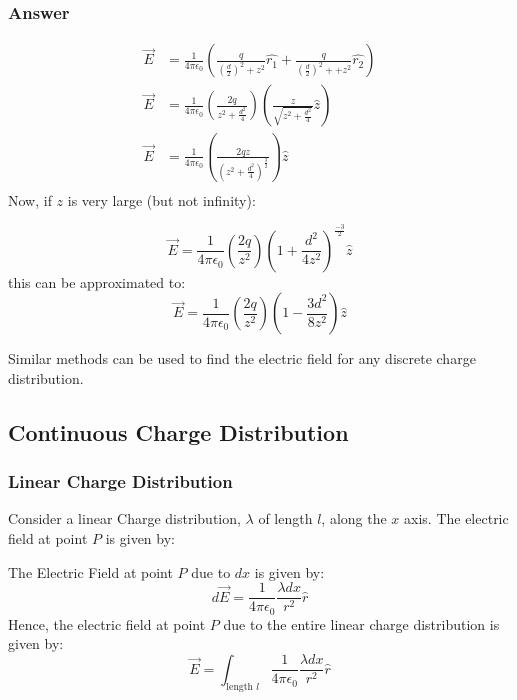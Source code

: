\documentclass{article}
\begin{document}
\subsubsection*{Answer}
\begin{align*}
	\vec{E} & = \frac{1}{4\pi\epsilon_0} \left( \frac{q}{\left(\frac{d}{2}\right)^2 + z^2} \hat{r_1} + \frac{q}{\left(\frac{d}{2}\right)^2 + + z^2} \hat{r_2} \right) \\
	\vec{E} & = \frac{1}{4\pi\epsilon_0} \left( \frac{2q}{z^2 + \frac{d^2}{4}}\right) \left(\frac{z}{\sqrt{z^2 + \frac{d^2}{4}}}\hat{z}\right)                        \\
	\vec{E} & = \frac{1}{4\pi\epsilon_0} \left( \frac{2qz}{\left(z^2 + \frac{d^2}{4}\right)^{\frac{3}{2}}}\right) \hat{z}                                             \\
\end{align*}
Now, if $z$ is very large (but not infinity):

\[\vec{E} = \frac{1}{4\pi\epsilon_0} \left( \frac{2q}{z^2}\right)\left(1 + \frac{d^2}{4z^2}\right)^{\frac{-3}{2}} \hat{z}\]
this can be approximated to:
\[\vec{E} = \frac{1}{4\pi\epsilon_0} \left( \frac{2q}{z^2}\right)\left(1 - \frac{3d^2}{8z^2}\right) \hat{z}\]

Similar methods can be used to find the electric field for any discrete charge distribution.

\subsection{Continuous Charge Distribution}
\subsubsection{Linear Charge Distribution}
Consider a linear Charge distribution, $\lambda$ of length $l$, along the $x$ axis. The electric field at point $P$ is given by:
\begin{figure}[H]
	\centering
\end{figure}
The Electric Field at point $P$ due to $dx$ is given by:
\[d\vec{E} = \frac{1}{4\pi \epsilon_0} \frac{\lambda dx}{r^2} \hat{r}  \]
Hence, the electric field at point $P$ due to the entire linear charge distribution is given by:
\[\vec{E} = \int_{\text{length $l$}} \frac{1}{4\pi \epsilon_0} \frac{\lambda dx}{r^2} \hat{r} \]
\end{document}

